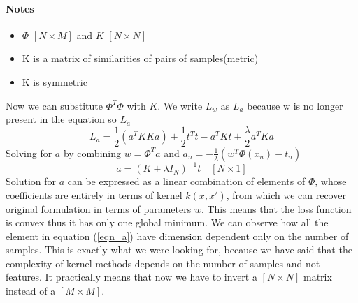 \documentclass[../main.tex]{subfiles}
\begin{document}
\paragraph{Notes}
\begin{itemize}
    \item $\Phi$ $[N \times M]$ and $K$ $[N \times N]$
    \item K is a matrix of similarities of pairs of samples(metric)
    \item K is symmetric
\end{itemize}
Now we can substitute $\Phi^T \Phi$ with $K$. We write $L_w$ as $L_a$ because w is no longer present in the equation so $L_a$
\begin{equation*}
    L_a = \frac{1}{2}(a^T K K a) + \frac{1}{2}t^T t - a^T K t +\frac{\lambda}{2} a^T K a
\end{equation*}
Solving for $a$ by combining $w=\Phi^T a$ and $a_n=-\frac{1}{\lambda}(w^T \Phi(x_n)-t_n)$
\begin{equation}
    a = (K + \lambda I_N)^{-1} t \quad [N \times 1]
\end{equation} \label{eqn_a}
Solution for $a$ can be expressed as a linear combination of elements of $\Phi$, whose coefficients are entirely in terms of kernel $k(x,x')$, from
which we can recover original formulation in terms of parameters $w$. This means that the loss function is convex thus it has only one global minimum. We can observe how all the element in equation (\ref{eqn_a}) have dimension dependent only on the number of samples. This is exactly what we were looking for, because we have said that the complexity of kernel methods depends on the number of samples and not features. It practically means that now we have to invert a $[N \times N]$
 matrix instead of a $[M \times M]$.
\end{document}
